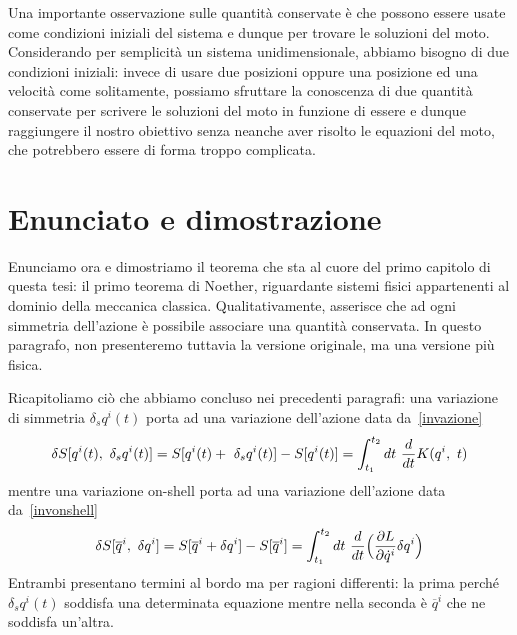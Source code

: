     Una importante osservazione sulle quantità conservate è che possono essere usate come condizioni iniziali del sistema e dunque per trovare le soluzioni del moto. Considerando per semplicità un sistema unidimensionale, abbiamo bisogno di due condizioni iniziali: invece di usare due posizioni oppure una posizione ed una velocità come solitamente, possiamo sfruttare la conoscenza di due quantità conservate per scrivere le soluzioni del moto in funzione di essere e dunque raggiungere il nostro obiettivo senza neanche aver risolto le equazioni del moto, che potrebbero essere di forma troppo complicata. 

\section{Enunciato e dimostrazione}
    Enunciamo ora e dimostriamo il teorema che sta al cuore del primo capitolo di questa tesi: il primo teorema di Noether, riguardante sistemi fisici appartenenti al dominio della meccanica classica. Qualitativamente, asserisce che ad ogni simmetria dell'azione è possibile associare una quantità conservata. In questo paragrafo, non presenteremo tuttavia la versione originale, ma una versione più fisica. 

    Ricapitoliamo ciò che abbiamo concluso nei precedenti paragrafi: una variazione di simmetria $\delta_s q^i(t)$ porta ad una variazione dell'azione data da~\eqref{invazione} 
    \begin{equation*}
        \delta S[q^i(t), ~\delta_s q^i(t)] = S[q^i(t) + ~\delta_s q^i(t)] - S[q^i(t)] = \int_{t_1}^{t_2}dt~ \frac{d}{dt} K(q^i, ~t)
    \end{equation*}
    mentre una variazione on-shell porta ad una variazione dell'azione data da~\eqref{invonshell} 
    \begin{equation*}
        \delta S[\overline q^i,~\delta q^i] = S[\overline q^i + \delta q^i] - S[\overline q^i] = \int_{t_1}^{t_2}dt~ \frac{d}{dt} \Big( \frac{\partial L}{\partial\dot q^i} \delta q^i \Big )
    \end{equation*}
    Entrambi presentano termini al bordo ma per ragioni differenti: la prima perché $\delta_s q^i(t)$ soddisfa una determinata equazione mentre nella seconda è $\overline q^i$ che ne soddisfa un'altra.

